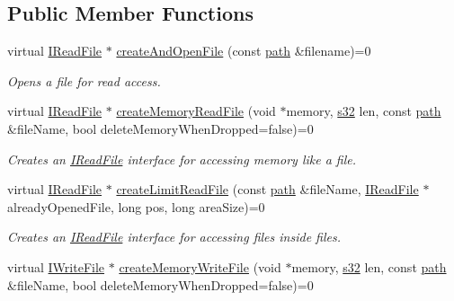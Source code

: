 \subsection*{Public Member Functions}
\begin{DoxyCompactItemize}
\item 
virtual \hyperlink{classirr_1_1io_1_1IReadFile}{I\+Read\+File} $\ast$ \hyperlink{classirr_1_1io_1_1IFileSystem_a3678bb77e12cc6ee2b3947f4c79f6c90}{create\+And\+Open\+File} (const \hyperlink{namespaceirr_1_1io_ab1bdc45edb3f94d8319c02bc0f840ee1}{path} \&filename)=0
\begin{DoxyCompactList}\small\item\em Opens a file for read access. \end{DoxyCompactList}\item 
virtual \hyperlink{classirr_1_1io_1_1IReadFile}{I\+Read\+File} $\ast$ \hyperlink{classirr_1_1io_1_1IFileSystem_ac60a4b7912a7f2364426dc1aaf9bccae}{create\+Memory\+Read\+File} (void $\ast$memory, \hyperlink{namespaceirr_ac66849b7a6ed16e30ebede579f9b47c6}{s32} len, const \hyperlink{namespaceirr_1_1io_ab1bdc45edb3f94d8319c02bc0f840ee1}{path} \&file\+Name, bool delete\+Memory\+When\+Dropped=false)=0
\begin{DoxyCompactList}\small\item\em Creates an \hyperlink{classirr_1_1io_1_1IReadFile}{I\+Read\+File} interface for accessing memory like a file. \end{DoxyCompactList}\item 
virtual \hyperlink{classirr_1_1io_1_1IReadFile}{I\+Read\+File} $\ast$ \hyperlink{classirr_1_1io_1_1IFileSystem_a8b110f1ed6f52098753b7a558c020dbc}{create\+Limit\+Read\+File} (const \hyperlink{namespaceirr_1_1io_ab1bdc45edb3f94d8319c02bc0f840ee1}{path} \&file\+Name, \hyperlink{classirr_1_1io_1_1IReadFile}{I\+Read\+File} $\ast$already\+Opened\+File, long pos, long area\+Size)=0
\begin{DoxyCompactList}\small\item\em Creates an \hyperlink{classirr_1_1io_1_1IReadFile}{I\+Read\+File} interface for accessing files inside files. \end{DoxyCompactList}\item 
virtual \hyperlink{classirr_1_1io_1_1IWriteFile}{I\+Write\+File} $\ast$ \hyperlink{classirr_1_1io_1_1IFileSystem_a568dd1e737fe3d3222b2e4ca2b6ebad3}{create\+Memory\+Write\+File} (void $\ast$memory, \hyperlink{namespaceirr_ac66849b7a6ed16e30ebede579f9b47c6}{s32} len, const \hyperlink{namespaceirr_1_1io_ab1bdc45edb3f94d8319c02bc0f840ee1}{path} \&file\+Name, bool delete\+Memory\+When\+Dropped=false)=0

\end{DoxyCompactItemize}
